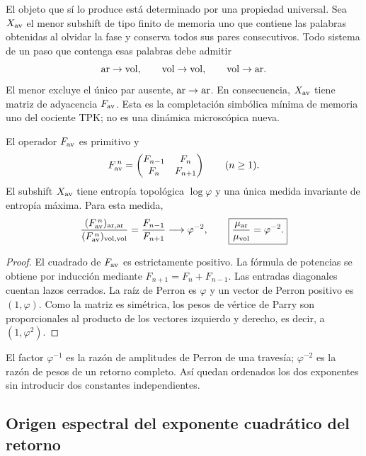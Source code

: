 El objeto que sí lo produce está determinado por una propiedad universal.
Sea \(X_{\rm av}\) el menor subshift de tipo finito de memoria uno que
contiene las palabras obtenidas al olvidar la fase y conserva todos sus
pares consecutivos. Todo sistema de un paso que contenga esas palabras debe
admitir
\[
 {\rm ar}\to{\rm vol},\qquad
 {\rm vol}\to{\rm vol},\qquad
 {\rm vol}\to{\rm ar}.
\]
El menor excluye el único par ausente, \({\rm ar}\to{\rm ar}\). En
consecuencia, \(X_{\rm av}\) tiene matriz de adyacencia \(F_{\rm av}\).
Esta es la completación simbólica mínima de memoria uno del cociente TPK; no
es una dinámica microscópica nueva.

\begin{theorem}
\label{p12-83-c16-s3:thm:ley-fibonacci-retornos-corta}
El operador \(F_{\rm av}\) es primitivo y
\[
 F_{\rm av}^{\,n}
 =\begin{pmatrix}F_{n-1}&F_n\\F_n&F_{n+1}\end{pmatrix}
 \qquad(n\geq1).
\]
El subshift \(X_{\rm av}\) tiene entropía topológica
\(\log\varphi\) y una única medida invariante de entropía máxima. Para
esta medida,
\[
 \frac{(F_{\rm av}^{\,n})_{\rm ar,ar}}
 {(F_{\rm av}^{\,n})_{\rm vol,vol}}
 =\frac{F_{n-1}}{F_{n+1}}
 \longrightarrow\varphi^{-2},
 \qquad
 \boxed{\frac{\mu_{\rm ar}}{\mu_{\rm vol}}=\varphi^{-2}.}
\]
\end{theorem}

\begin{proof}
El cuadrado de \(F_{\rm av}\) es estrictamente positivo. La fórmula de
potencias se obtiene por inducción mediante
\(F_{n+1}=F_n+F_{n-1}\). Las entradas diagonales cuentan lazos cerrados.
La raíz de Perron es \(\varphi\) y un vector de Perron positivo es
\((1,\varphi)\). Como la matriz es simétrica, los pesos de vértice de
Parry son proporcionales al producto de los vectores izquierdo y derecho,
es decir, a \((1,\varphi^2)\).
\end{proof}

El factor \(\varphi^{-1}\) es la razón de amplitudes de Perron de una
travesía; \(\varphi^{-2}\) es la razón de pesos de un retorno completo.
Así quedan ordenados los dos exponentes sin introducir dos constantes
independientes.

\subsection{Origen espectral del exponente cuadrático del retorno}


